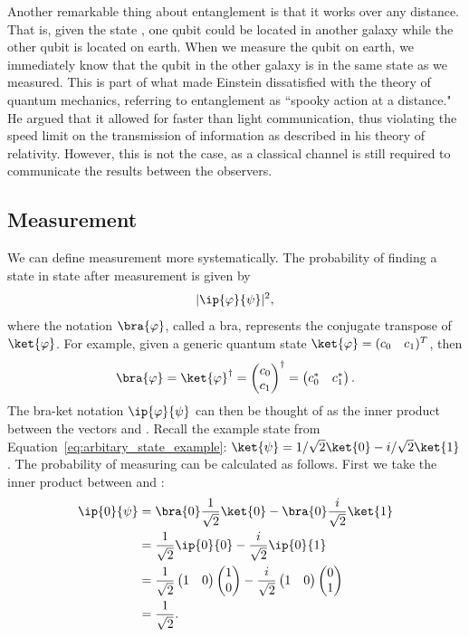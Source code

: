 \documentclass[a4paper,10pt]{article}
\newcommand{\qstatezero}{
	\begin{pmatrix}1 \\ 0\end{pmatrix}
}
\newcommand{\qstateone}{
	\begin{pmatrix}0 \\ 1\end{pmatrix}
}
\begin{document}
Another remarkable thing about entanglement is that it works over any distance.
That is, given the state \ket{\Phi^+}, one qubit could be located in another galaxy while the other qubit is located on earth.
When we measure the qubit on earth, we immediately know that the qubit in the other galaxy is in the same state as we measured.
This is part of what made Einstein dissatisfied with the theory of quantum mechanics, referring to entanglement as ``spooky action at a distance."
He argued that it allowed for faster than light communication, thus violating the speed limit on the transmission of information as described in his theory of relativity.
However, this is not the case, as a classical channel is still required to communicate the results between the observers.

\subsection{Measurement}
We can define measurement more systematically.
The probability of finding a state \ket{\psi} in state \ket{\varphi} after measurement is given by
\begin{equation}
\lvert\ip{\varphi}{\psi}\rvert^2,
\end{equation}
where the notation $\bra{\varphi}$, called a bra, represents the conjugate transpose of $\ket{\varphi}$.
For example, given a generic quantum state $\ket{\varphi} = (\begin{matrix}c_0 & c_1\end{matrix})^T$, then 
\begin{equation}
\bra{\varphi} = \ket{\varphi}^\dagger = \begin{pmatrix}c_0 \\ c_1\end{pmatrix}^\dagger =  \begin{pmatrix}c_0^* & c_1^*\end{pmatrix}.
\end{equation}
The bra-ket notation $\ip{\varphi}{\psi}$ can then be thought of as the inner product between the vectors \ket{\varphi} and \ket{\psi}.
Recall the example state from Equation~\ref{eq:arbitary_state_example}: $\ket{\psi} = 1/\sqrt2\ket{0} - i/\sqrt2\ket{1}$.
The probability of measuring  can be calculated as follows.
First we take the inner product between  and \ket{\psi}:
\begin{equation}
\begin{aligned}
\ip{0}{\psi} &= \bra{0}\dfrac{1}{\sqrt2}\ket{0} - \bra{0}\dfrac{i}{\sqrt2}\ket{1} \\
&= \dfrac{1}{\sqrt2}\ip{0}{0} - \dfrac{i}{\sqrt2}\ip{0}{1} \\
&= \dfrac{1}{\sqrt2}\begin{pmatrix}1 & 0\end{pmatrix} \qstatezero - \dfrac{i}{\sqrt2}\begin{pmatrix}1 & 0\end{pmatrix} \qstateone \\
&= \dfrac{1}{\sqrt2}. \\
\end{aligned}
\end{equation}
\end{document}
